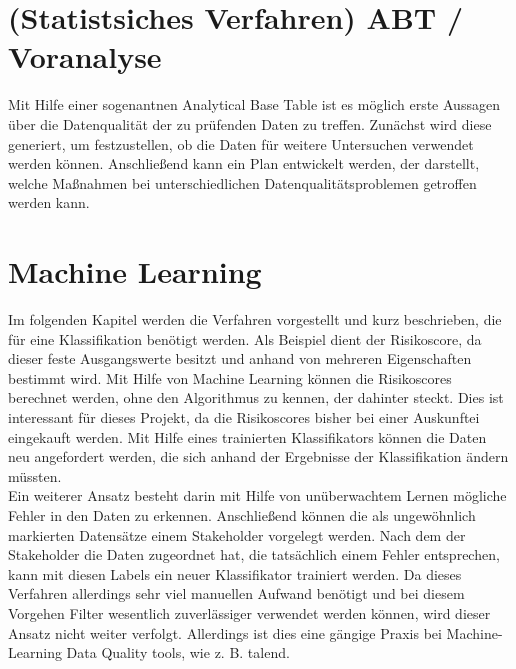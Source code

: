 \section{(Statistsiches Verfahren) ABT / Voranalyse}
Mit Hilfe einer sogenantnen Analytical Base Table ist es möglich erste Aussagen über die Datenqualität der zu prüfenden Daten zu treffen.
Zunächst wird diese generiert, um festzustellen, ob die Daten für weitere Untersuchen verwendet werden können.
Anschließend kann ein Plan entwickelt werden, der darstellt, welche Maßnahmen bei unterschiedlichen Datenqualitätsproblemen getroffen werden kann.






\section{Machine Learning}
Im folgenden Kapitel werden die Verfahren vorgestellt und kurz beschrieben, die für eine Klassifikation benötigt werden. 
Als Beispiel dient der Risikoscore, da dieser feste Ausgangswerte besitzt und anhand von mehreren Eigenschaften bestimmt wird. 
Mit Hilfe von Machine Learning können die Risikoscores berechnet werden, ohne den Algorithmus zu kennen, der dahinter steckt. 
Dies ist interessant für dieses Projekt, da die Risikoscores bisher bei einer Auskunftei eingekauft werden.
Mit Hilfe eines trainierten Klassifikators können die Daten neu angefordert werden, die sich anhand der Ergebnisse der Klassifikation ändern müssten. 
\\
Ein weiterer Ansatz besteht darin mit Hilfe von unüberwachtem Lernen mögliche Fehler in den Daten zu erkennen.
Anschließend können die als ungewöhnlich markierten Datensätze einem Stakeholder vorgelegt werden.
Nach dem der Stakeholder die Daten zugeordnet hat, die tatsächlich einem Fehler entsprechen, kann mit diesen Labels ein neuer Klassifikator trainiert werden. 
Da dieses Verfahren allerdings sehr viel manuellen Aufwand benötigt und bei diesem Vorgehen Filter wesentlich zuverlässiger verwendet werden können, wird dieser Ansatz nicht weiter verfolgt.
Allerdings ist dies eine gängige Praxis bei Machine-Learning Data Quality tools, wie z. B. talend. 


